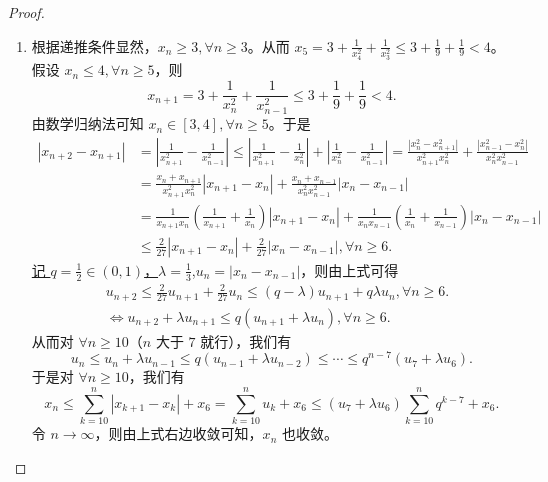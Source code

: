 \documentclass[lang=cn,newtx,10pt,scheme=chinese]{elegantbook}
\begin{document}
\begin{proof}
\begin{enumerate}
\item 根据递推条件显然，\(x_n\geqslant 3,\forall n\geqslant 3\)。从而 \(x_5 = 3+\frac{1}{x_{4}^{2}}+\frac{1}{x_{3}^{2}}\leqslant 3+\frac{1}{9}+\frac{1}{9}<4\)。假设 \(x_n\leqslant 4,\forall n\geqslant 5\)，则
\[
x_{n + 1}=3+\frac{1}{x_{n}^{2}}+\frac{1}{x_{n - 1}^{2}}\leqslant 3+\frac{1}{9}+\frac{1}{9}<4.
\]
由数学归纳法可知 \(x_n\in [3,4],\forall n\geqslant 5\)。于是
\begin{align*}
\left| x_{n+2}-x_{n+1} \right|&=\left| \frac{1}{x_{n+1}^{2}}-\frac{1}{x_{n-1}^{2}} \right|\leqslant \left| \frac{1}{x_{n+1}^{2}}-\frac{1}{x_{n}^{2}} \right|+\left| \frac{1}{x_{n}^{2}}-\frac{1}{x_{n-1}^{2}} \right|=\frac{\left| x_{n}^{2}-x_{n+1}^{2} \right|}{x_{n+1}^{2}x_{n}^{2}}+\frac{\left| x_{n-1}^{2}-x_{n}^{2} \right|}{x_{n}^{2}x_{n-1}^{2}}
\\
&=\frac{x_n+x_{n+1}}{x_{n+1}^{2}x_{n}^{2}}\left| x_{n+1}-x_n \right|+\frac{x_n+x_{n-1}}{x_{n}^{2}x_{n-1}^{2}}\left| x_n-x_{n-1} \right|
\\
&=\frac{1}{x_{n+1}x_n}\left( \frac{1}{x_{n+1}}+\frac{1}{x_n} \right) \left| x_{n+1}-x_n \right|+\frac{1}{x_nx_{n-1}}\left( \frac{1}{x_n}+\frac{1}{x_{n-1}} \right) \left| x_n-x_{n-1} \right|
\\
&\leqslant \frac{2}{27}\left| x_{n+1}-x_n \right|+\frac{2}{27}\left| x_n-x_{n-1} \right|,\forall n\geqslant 6.      
\end{align*}
\hyperlink{取q,lambda的原因}{记 \(q = \frac{1}{2}\in(0,1)\)，\(\lambda=\frac{1}{3}\)},\(u_n = |x_n - x_{n - 1}|\)，则由上式可得
\begin{align*}
&u_{n + 2}\leqslant \frac{2}{27}u_{n + 1}+\frac{2}{27}u_n
\leqslant (q - \lambda)u_{n + 1}+q\lambda u_n,\forall n\geqslant 6.\\
&\Leftrightarrow u_{n + 2}+\lambda u_{n + 1}\leqslant q(u_{n + 1}+\lambda u_n),\forall n\geqslant 6.
\end{align*}
从而对 \(\forall n\geqslant 10\)（\(n\) 大于 \(7\) 就行），我们有
\[
u_n\leqslant u_n+\lambda u_{n - 1}\leqslant q(u_{n - 1}+\lambda u_{n - 2})\leqslant\cdots\leqslant q^{n - 7}(u_7+\lambda u_6).
\]
于是对 \(\forall n\geqslant 10\)，我们有
\[
x_n\leqslant \sum_{k = 10}^n|x_{k + 1}-x_k|+x_6=\sum_{k = 10}^n u_k+x_6\leqslant (u_7+\lambda u_6)\sum_{k = 10}^n q^{k - 7}+x_6.
\]
令 \(n\rightarrow\infty\)，则由上式右边收敛可知，\(x_n\) 也收敛。
\end{enumerate}    
\end{proof}
\end{document}
